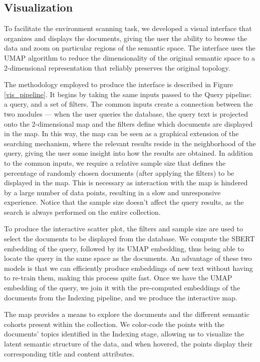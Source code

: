 \documentclass[a4paper]{article}
\begin{document}
\subsection{Visualization}
To facilitate the environment scanning task, we developed a visual interface that organizes and displays the documents, giving the user the ability to browse the data and zoom on particular regions of the semantic space. The interface uses the UMAP algorithm to reduce the dimensionality of the original semantic space to a 2-dimensional representation that reliably preserves the original topology.

The methodology employed to produce the interface is described in Figure \ref{vis_pipeline}. It begins by taking the same inputs passed to the Query pipeline: a query, and a set of filters. The common inputs create a connection between the two modules — when the user queries the database, the query text is projected onto the 2-dimensional map and the filters define which documents are displayed in the map. In this way, the map can be seen as a graphical extension of the searching mechanism, where the relevant results reside in the neighborhood of the query, giving the user some insight into how the results are obtained. In addition to the common inputs, we require a relative sample size that defines the percentage of randomly chosen documents (after applying the filters) to be displayed in the map. This is necessary as interaction with the map is hindered by a large number of data points, resulting in a slow and unresponsive experience. Notice that the sample size doesn't affect the query results, as the search is always performed on the entire collection.

To produce the interactive scatter plot, the filters and sample size are used to select the documents to be displayed from the database. We compute the SBERT embedding of the query, followed by its UMAP embedding, thus being able to locate the query in the same space as the documents. An advantage of these two models is that we can efficiently produce embeddings of new text without having to re-train them, making this process quite fast. Once we have the UMAP embedding of the query, we join it with the pre-computed embeddings of the documents from the Indexing pipeline, and we produce the interactive map.

The map provides a means to explore the documents and the different semantic cohorts present within the collection. We color-code the points with the documents' topics identified in the Indexing stage, allowing us to visualize the latent semantic structure of the data, and when hovered, the points display their corresponding title and content attributes.
\end{document}
